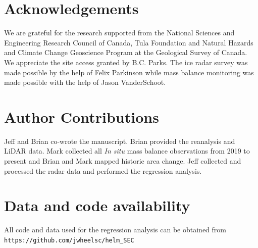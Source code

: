 \documentclass[annals,review,oneside]{igs}
\begin{document}
\section{Acknowledgements}

We are grateful for the research supported from the National Sciences and Engineering Research Council of Canada, Tula Foundation and Natural Hazards and Climate Change Geoscience Program at the Geological Survey of Canada. We appreciate the site access granted by B.C. Parks. The ice radar survey was made possible by the help of Felix Parkinson while mass balance monitoring was made possible with the help of Jason VanderSchoot. 

\section{Author Contributions}

Jeff and Brian co-wrote the manuscript. Brian provided the reanalysis and LiDAR data. Mark collected all \emph{In situ} mass balance observations from 2019 to present and Brian and Mark mapped historic area change. Jeff collected and processed the radar data and performed the regression analysis. 

\section{Data and code availability}

All code and data used for the regression analysis can be obtained from \verb|https://github.com/jwheelsc/helm_SEC|



\end{document}
